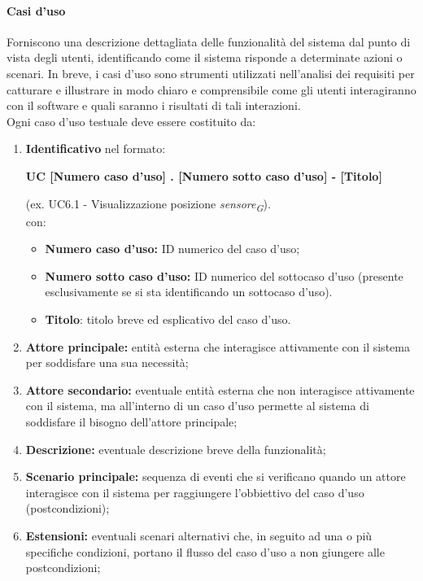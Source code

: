 \paragraph{Casi d'uso}
Forniscono una descrizione dettagliata delle funzionalità del sistema dal punto di vista degli utenti, identificando come il sistema risponde a determinate azioni o scenari. In breve, i casi d'uso sono strumenti utilizzati nell'analisi dei requisiti per catturare e illustrare in modo chiaro e comprensibile come gli utenti interagiranno con il software e quali saranno i risultati di tali interazioni. \\
Ogni caso d'uso testuale deve essere costituito da:
\begin{enumerate}
    \item \textbf{Identificativo} nel formato:\\
          \begin{center}
              \textbf{UC [Numero caso d'uso] . [Numero sotto caso d'uso] - [Titolo]}
          \end{center}
          (ex. UC6.1 - Visualizzazione posizione \textit{sensore}\textsubscript{\textit{G}}).\\
          con:
          \begin{itemize}
              \item \textbf{Numero caso d'uso:} ID numerico del caso d'uso;
              \item \textbf{Numero sotto caso d'uso:} ID numerico del sottocaso d'uso (presente esclusivamente se si sta identificando un sottocaso d'uso).
              \item \textbf{Titolo}: titolo breve ed esplicativo del caso d'uso.
          \end{itemize}
    \item \textbf{Attore principale:} entità esterna che interagisce attivamente con il sistema per soddisfare una sua necessità;
    \item \textbf{Attore secondario:} eventuale entità esterna che non interagisce attivamente con il sistema, ma all'interno di un caso d'uso permette al sistema di soddisfare il bisogno dell'attore principale;
    \item \textbf{Descrizione:} eventuale descrizione breve della funzionalità;
    \item \textbf{Scenario principale:} sequenza di eventi che si verificano quando un attore interagisce con il sistema per raggiungere l'obbiettivo del caso d'uso (postcondizioni);
    \item \textbf{Estensioni:} eventuali scenari alternativi che, in seguito ad una o più specifiche condizioni, portano il flusso del caso d'uso a non giungere alle postcondizioni;

\end{enumerate}
